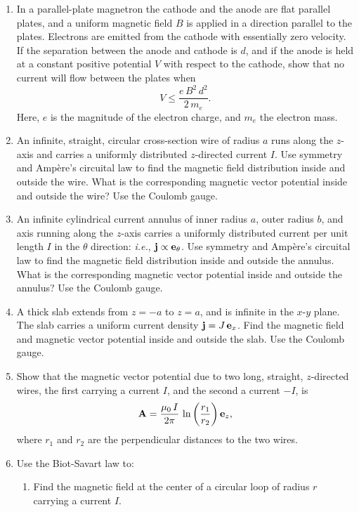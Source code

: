 {\begin{enumerate}
along the $z$-axis. Find the particle's subsequent motion in the $x$-$y$ plane. Sketch the particle's trajectory.
\item In a parallel-plate magnetron the cathode and the anode are
flat parallel plates, and a uniform magnetic field $B$ is applied in a direction
parallel to the plates. Electrons are emitted from the cathode with essentially
zero velocity. If the separation between the anode and cathode is $d$,
and if the anode is held at a constant positive potential $V$ with respect to the cathode, show that no current will flow between the plates when
$$
V \leq \frac{e\,B^2\,d^2}{2\,m_e}.
$$
Here, $e$ is the magnitude of the electron charge, and $m_e$ the
electron mass.

\item An infinite, straight, circular cross-section wire of radius $a$ runs along the 
$z$-axis and carries a uniformly distributed $z$-directed current $I$. Use symmetry and Amp\`{e}re's circuital law to find the magnetic field distribution inside and outside the
wire. What is the corresponding magnetic vector potential inside and
outside the wire? Use the Coulomb gauge.
\item An infinite cylindrical current annulus of inner radius $a$, outer
radius $b$, and axis running along the $z$-axis carries a uniformly
distributed current per unit length $I$ in the $\theta$ direction: {\em i.e.},
${\bf j}\propto {\bf e}_\theta$. Use symmetry and Amp\`{e}re's circuital law to find the magnetic field distribution inside and outside the
annulus. What is the corresponding magnetic vector potential inside and
outside the annulus? Use the Coulomb gauge.
\item A thick slab extends from $z=-a$ to $z=a$, and is infinite in the $x$-$y$
plane. The slab carries a uniform current density ${\bf j} = J\,{\bf e}_x$.
Find the magnetic field and magnetic vector potential inside and outside the
slab. Use the Coulomb gauge.
\item Show that the magnetic vector potential due to two long, straight, $z$-directed wires, the first carrying a current $I$, and the second a current $-I$, 
is 
$$
{\bf A} = \frac{\mu_0\,I}{2\pi}\,\ln\left(\frac{r_1}{r_2}\right){\bf e}_z,
$$
where $r_1$ and $r_2$ are the perpendicular distances to the two wires.
\item Use the Biot-Savart law to:
\begin{enumerate}
\item Find the magnetic field at the center of a circular loop of radius $r$
carrying a current $I$.

\end{enumerate}
\end{enumerate}}

